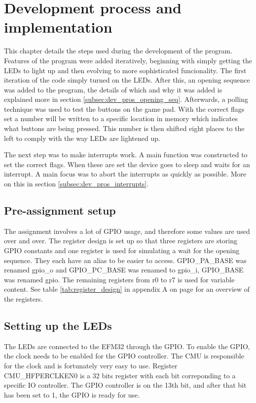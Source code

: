 \section{Development process and implementation}
\label{chap:development_process}

This chapter details the steps used during the development of the program. Features of the program were added iteratively, beginning with simply getting the LEDs to light up and then evolving to more sophisticated funcionality. The first iteration of the code simply turned on the LEDs. After this, an opening sequence was added to the program, the details of which and why it was added is explained more in section \ref{subsec:dev_pros_opening_seq}. Afterwards, a polling technique was used to test the buttons on the game pad. With the correct flags set a number will be written to a specific location in memory which indicates what buttons are being pressed. This number is then shifted eight places to the left to comply with the way LEDs are lightened up.

The next step was to make interrupts work. A main function was constructed to set the correct flags. When these are set the device goes to sleep and waits for an interrupt. A main focus was to abort the interrupts as quickly as possible. More on this in section \ref{subsec:dev_pros_interrupts}.

\subsection{Pre-assignment setup}
\label{subsec:pre-assingment_setup}

The assignment involves a lot of GPIO usage, and therefore some values are used over and over. The register design is set up so that three registers are storing GPIO constants and one register is used for simulating a wait for the opening sequence. They each have an alias to be easier to access. GPIO\_PA\_BASE was renamed gpio\_o and GPIO\_PC\_BASE was renamed to gpio\_i, GPIO\_BASE was renamed gpio. The remaining registers from r0 to r7 is used for variable content. See table \ref{tab:register_design} in appendix A on page \pageref{tab:register_design} for an overview of the registers.

\subsection{Setting up the LEDs}
\label{subsec:dev_pros_setup_led}

The LEDs are connected to the EFM32 through the GPIO. To enable the GPIO, the clock needs to be enabled for the GPIO controller. The CMU is responsible for the clock and is fortunately very easy to use. Register CMU\_HFPERCLKEN0 is a 32 bits register with each bit correponding to a specific IO controller. The GPIO controller is on the 13th bit, and after that bit has been set to 1, the GPIO is ready for use.

